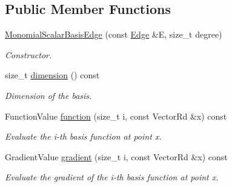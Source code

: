 \subsection*{Public Member Functions}
\begin{DoxyCompactItemize}
\item 
\hyperlink{classHArDCore3D_1_1MonomialScalarBasisEdge_a5d0c563a52d9debf6889e2f994342ec7}{Monomial\+Scalar\+Basis\+Edge} (const \hyperlink{classHArDCore3D_1_1Edge}{Edge} \&E, size\+\_\+t degree)
\begin{DoxyCompactList}\small\item\em Constructor. \end{DoxyCompactList}\item 
\mbox{\label{classHArDCore3D_1_1MonomialScalarBasisEdge_a9e4059481a81157311d0137bfe0935e1}} 
size\+\_\+t \hyperlink{classHArDCore3D_1_1MonomialScalarBasisEdge_a9e4059481a81157311d0137bfe0935e1}{dimension} () const
\begin{DoxyCompactList}\small\item\em Dimension of the basis. \end{DoxyCompactList}\item 
\mbox{\label{classHArDCore3D_1_1MonomialScalarBasisEdge_afa89fccabeee35112f4aec3bb8bd212b}} 
Function\+Value \hyperlink{classHArDCore3D_1_1MonomialScalarBasisEdge_afa89fccabeee35112f4aec3bb8bd212b}{function} (size\+\_\+t i, const Vector\+Rd \&x) const
\begin{DoxyCompactList}\small\item\em Evaluate the i-\/th basis function at point x. \end{DoxyCompactList}\item 
\mbox{\label{classHArDCore3D_1_1MonomialScalarBasisEdge_ae0c76acbc1682b81cc2fe25f23d7884f}} 
Gradient\+Value \hyperlink{classHArDCore3D_1_1MonomialScalarBasisEdge_ae0c76acbc1682b81cc2fe25f23d7884f}{gradient} (size\+\_\+t i, const Vector\+Rd \&x) const
\begin{DoxyCompactList}\small\item\em Evaluate the gradient of the i-\/th basis function at point x. \end{DoxyCompactList}\end{DoxyCompactItemize}
